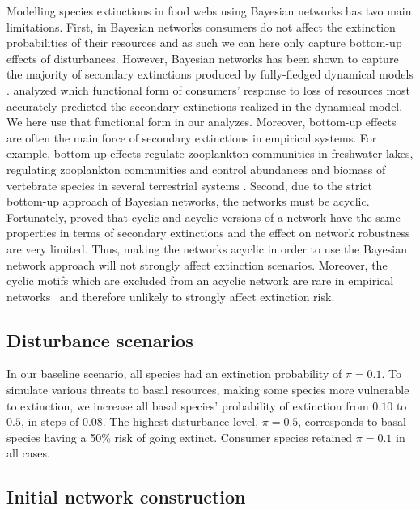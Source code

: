 \documentclass[12pt]{article}
\begin{document}
\begin{spacing}{2.0}
		Modelling species extinctions in food webs using Bayesian networks has two main limitations. 
		First, in Bayesian networks consumers do not affect the extinction probabilities of their resources and as such we can here only capture bottom-up effects of disturbances. 
		However, Bayesian networks has been shown to capture the majority of secondary extinctions produced by fully-fledged dynamical models \citep{Eklof2013}.
		\cite{Eklof2013} analyzed which functional form of consumers' response to loss of resources most accurately predicted the secondary extinctions realized in the dynamical model. 
		We here use that functional form in our analyzes.  
		Moreover, bottom-up effects are often the main force of secondary extinctions in empirical systems. 
		For example, bottom-up effects regulate zooplankton communities in freshwater lakes, regulating zooplankton communities \citep{li2020bottom} and control abundances and biomass of vertebrate species in several terrestrial systems \citep{Dobson2009food, Mduma1999food, Georgiadis2007}. 
		Second, due to the strict bottom-up approach of Bayesian networks, the networks must be acyclic.
		Fortunately, \cite{Allesina2009functional} proved that cyclic and acyclic versions of a network have the same properties in terms of secondary extinctions and the effect on network robustness are very limited. 
		Thus, making the networks acyclic in order to use the Bayesian network approach will not strongly affect extinction scenarios.
		Moreover, the cyclic motifs which are excluded from an acyclic network are rare in empirical networks~\citep{Stouffer2007} and therefore unlikely to strongly affect extinction risk.
	
		
    \subsection*{Disturbance scenarios}
    
        In our baseline scenario, all species had an extinction probability of $\pi = 0.1$. 
		To simulate various threats to basal resources, making some species more vulnerable to extinction, we increase all basal species' probability of extinction from $0.10$ to $0.5$, in steps of $0.08$. 
		The highest disturbance level, $\pi = 0.5$, corresponds to basal species having a 50\% risk of going extinct. 
		Consumer species retained $\pi=0.1$ in all cases.
		
		
	\subsection*{Initial network construction}


\end{spacing}
\end{document}

